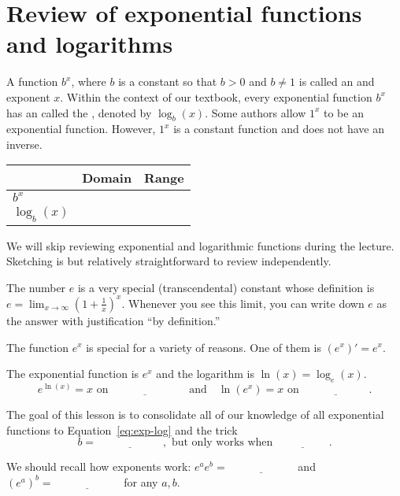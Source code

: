 \documentclass[../main.tex]{subfiles}
\begin{document}
 \section{Review of exponential functions and logarithms}
  A function \(b^{x}\), where \(b\) is a constant so that \(b > 0\) and \(b \ne 1\) is called an  and exponent \(x\). Within the context of our textbook, every exponential function \(b^{x}\) has an  called the , denoted by \(\log_{b}(x)\). \newline
  {\scriptsize Some authors allow \(1^{x}\) to be an exponential function. However, \(1^{x}\) is a constant function and does not have an inverse.}

  \begin{center}
    \begin{tabular}{l|p{1in}|p{1in}}
    & Domain & Range \\\midrule
      \(b^{x}\) & & \\\midrule
      \(\log_{b}(x)\) & &
    \end{tabular}
  \end{center}

  \faExclamationTriangle{} We will skip reviewing  exponential and logarithmic functions during the lecture. Sketching is  but relatively straightforward to review independently.


  The number \(e\) is a very special (transcendental) constant whose definition is \(e = \lim_{x \to \infty} \left( 1 + \frac{1}{x} \right)^{x}\). Whenever you see this limit, you can write down \(e\) as the answer with justification ``by definition.''
  \bigskip

  The function \(e^{x}\) is special for a variety of reasons. One of them is \((e^{x})' = e^{x}\).
  \begin{mdframed}[style=simple]
    The  exponential function is \(e^{x}\) and the  logarithm is \(\ln(x) = \log_{e}(x)\).
    \begin{equation} \label{eq:exp-log}
      e^{\ln(x)} = x \text{ on } \underline{\hspace{1in}} \quad\text{and}\quad \ln(e^{x}) = x \text{ on } \underline{\hspace{1in}}.
    \end{equation}

    The goal of this lesson is to consolidate all of our knowledge of all exponential functions to Equation~\eqref{eq:exp-log} and the  trick
    \begin{equation} \label{eq:exp-change-of-base}
      b = \underline{\hspace{1in}}, \text{ but only works when } \underline{\hspace{2cm}}.
    \end{equation}
  \end{mdframed}
  We should recall how exponents work: \(e^{a}e^{b} = \underline{\hspace{1in}}\) and \((e^{a})^{b} = \underline{\hspace{1in}}\) for any \(a,b\).
\end{document}
